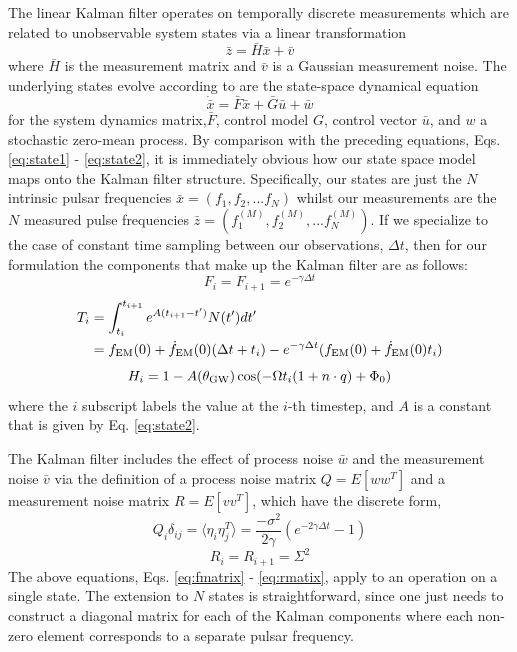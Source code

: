\documentclass[fleqn,usenatbib,useAMS]{mnras}
\begin{document}
The linear Kalman filter operates on temporally discrete measurements which are related to unobservable system states via a linear transformation
\begin{equation}
	\bar{z} = \bar{H} \bar{x} + \bar{v}
\end{equation}
where $\bar{H}$ is the measurement matrix and $\bar{v}$ is a Gaussian measurement noise. The underlying states evolve according to are the state-space dynamical equation 
\begin{equation}
	\dot{\bar{x}} = \bar{F} \bar{x} + \bar{G}\bar{u} + \bar{w}
\end{equation}
for the system dynamics matrix,$\bar{F}$,  control model $G$, control vector $\bar{u}$, and $w$ a stochastic zero-mean process. By comparison with the preceding equations, Eqs. 	\ref{eq:state1} - 	\ref{eq:state2}, it is immediately obvious how our state space model maps onto the Kalman filter structure. Specifically, our states are just the $N$ intrinsic pulsar frequencies $\bar{x} = (f_1,f_2,...f_N)$ whilst our measurements are the $N$ measured pulse frequencies $\bar{z} = (f^{(M)}_1,f^{(M)}_2,...f^{(M)}_N)$. If we specialize to the case of constant time sampling between our observations, $\Delta t$, then for our formulation the components that make up the Kalman filter are as follows: 
\begin{equation}
	F_i = F_{i+1} = e^{-\gamma \Delta t}
	\label{eq:fmatrix}
\end{equation}
\begin{align}
	T_i &= \int_{t_i}^{t_{i+1}}  e^{A (t_{i+1} - t')} N(t') dt' \\
	& = f_{\rm EM}(0) + \dot{f}_{\rm EM}(0)  (\Delta t + t_i) - e^{-\gamma \Delta t} (f_{\rm EM}(0) + \dot{f}_{\rm EM}(0)t_i)
\end{align}
\begin{equation}
	H_i = 1 -A(\theta_{\rm GW}) \cos(-\Omega t_i (1 + n\cdot q ) + \Phi_0)
\end{equation}
where the $i$ subscript labels the value at the $i$-th timestep, and $A$ is a constant that is given by  Eq. \ref{eq:state2}. \newline 


\noindent The Kalman filter includes the effect of process noise $\bar{w}$ and the measurement noise $\bar{v}$ via the definition of a process noise matrix $Q = E[w w^T]$ and a measurement noise matrix $R = E[v v^T]$, which have the discrete form,
\begin{equation}
	Q_i  \delta_{ij}= \langle \eta_i \eta_j^T \rangle = \frac{- \sigma^2}{2 \gamma} \left( e^{-2 \gamma \Delta t} -1\right)
\end{equation}
\begin{equation}
	R_i = R_{i+1} = \Sigma^2
	\label{eq:rmatix}
\end{equation}
The above equations, Eqs. \ref{eq:fmatrix} - 	\ref{eq:rmatix}, apply to an operation on a single state. The extension to $N$ states is straightforward, since one just needs to construct a diagonal matrix for each of the Kalman components where each non-zero element corresponds to a separate pulsar frequency. 
\end{document}

